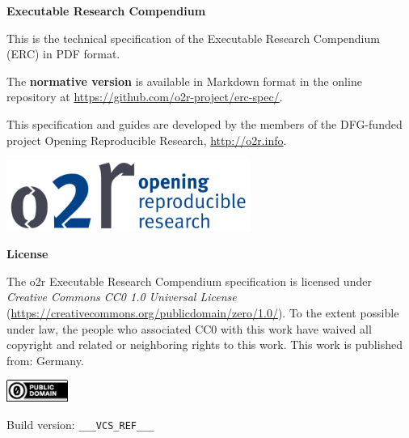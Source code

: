 \begin{titlepage}
    {\raggedleft
        \textbf{\Large Executable Research Compendium}\\
    }
    \vspace{\fill}
	
    This is the technical specification of the Executable Research Compendium (ERC) in PDF format.

    The \textbf{normative version} is available in Markdown format in the online repository at \url{https://github.com/o2r-project/erc-spec/}.

    This specification and guides are developed by the members of the DFG-funded project Opening Reproducible Research, \url{http://o2r.info}.

    \vspace{1cm}
    \begin{center}
        \includegraphics[width=8cm]{docs/o2r-logo}
    \end{center}
    \vspace{3cm}

    \textbf{License}

    The o2r Executable Research Compendium specification is licensed under \emph{Creative Commons CC0 1.0 Universal License} (\url{https://creativecommons.org/publicdomain/zero/1.0/}).
    To the extent possible under law, the people who associated CC0 with this work have waived all copyright and related or neighboring rights to this work.
    This work is published from: Germany.

    \includegraphics[width=2cm]{docs/cc-zero}

    Build version: \texttt{___VCS_REF___}
 
\end{titlepage}
